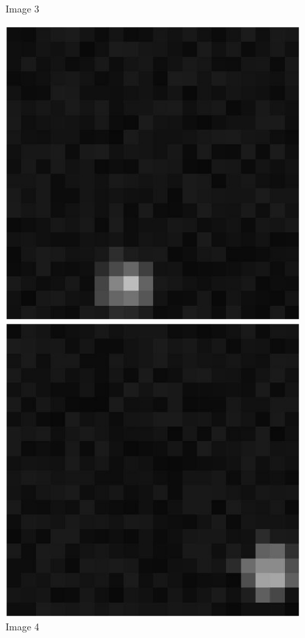 \documentclass[paper=a4, fontsize=11pt]{scrartcl}
\numberwithin{equation}{section}		%
\numberwithin{figure}{section}			%
\numberwithin{table}{section}				%
\begin{document}
\begin{figure}[!tbp]
  \centering
  \begin{minipage}[b]{0.4\textwidth}
	\caption{Image 3}
    \includegraphics[width=\textwidth]{sample3}
  \end{minipage}
  \hfill
  \begin{minipage}[b]{0.4\textwidth}
    \caption{Image 4}
    \includegraphics[width=\textwidth]{sample4}
  \end{minipage}
\end{figure}
\end{document}
